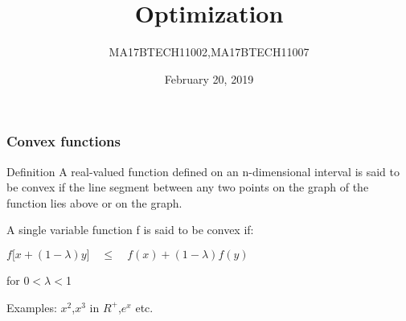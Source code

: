 \documentclass{beamer}
\title[Short title]{Optimization } %
\author{MA17BTECH11002,MA17BTECH11007} %
\institute[UCLA] %
{
Convexity of functions. \\ %
\medskip
\textit{Problem 1.5} %
}
\date{February 20, 2019} %
\begin{document}
\begin{frame}
\titlepage %
\end{frame}
\begin{frame}
\frametitle{Convex functions} %
\begin{block}{Definition}
A real-valued function defined on an n-dimensional interval is said to be convex if the line segment between any two points on the graph of the function lies above or on the graph.
\end{block}

A single variable function f is said to be convex if:\newline

\quad \quad \quad \quad \quad  $f[$\lambda$x+(1-\lambda)y] \quad \leq  \quad $\lambda$f(x)+(1-\lambda)f(y)$\newline

\quad \quad \quad \quad \quad \quad\quad \quad \quad \quad \quad \quadfor for 0$<$$\lambda$$<$1\newline

Examples: $x^{2}$,$x^{3}$ in $R^{+}$,$e^{x}$ etc.



\end{frame}
\end{document}
